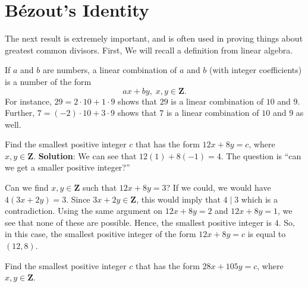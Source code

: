 \section{Bézout's Identity}
The next result is extremely important, and is often used in proving things
about greatest common divisors. First, We will recall a definition from linear algebra.
\begin{Definition}{}{}
    If $ a $ and $ b $ are numbers, a linear combination of $ a $ and $ b $ (with integer coefficients) is a number of the form
    \[ ax+by,\; x,y\in\mathbf{Z}. \]
    \tcblower{}
    For instance, $ 29=2\cdot 10+1\cdot 9 $ shows that $ 29 $ is a linear combination of $10$ and $9$.
    Further, $ 7=(-2)\cdot 10+3\cdot 9 $ shows that $ 7 $ is a linear combination of $ 10 $ and $ 9 $ as well.
\end{Definition}
\begin{Example}{}{}
    Find the smallest positive integer $ c $ that has the form $ 12x+8y=c $, where $ x,y\in\mathbf{Z} $.
    \tcblower{}
    \textbf{Solution}: We can see that $ 12(1)+8(-1)=4 $. The question is ``can we get a smaller positive integer?''

    Can we find $ x,y\in\mathbf{Z} $ such that $ 12x+8y=3 $? If we could, we would have $ 4(3x+2y)=3 $. Since $ 3x+2y\in\mathbf{Z} $,
    this would imply that $ 4\mid 3 $ which is a contradiction. Using the same argument on $ 12x+8y=2 $ and $ 12x+8y=1 $, we
    see that none of these are possible. Hence, the smallest positive integer is $4$. So, in this case, the smallest positive integer of the form
    $ 12x+8y=c $ is equal to $ (12,8) $.
\end{Example}
\begin{Example}{}{}
    Find the smallest positive integer $ c $ that has the form $ 28x+105y=c $, where $ x,y\in\mathbf{Z} $.
\end{Example}
